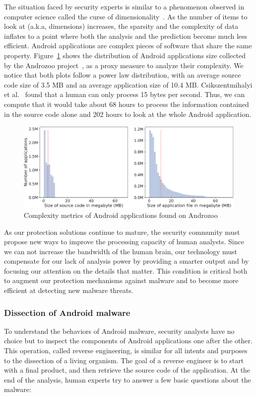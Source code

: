 The situation faced by security experts is similar to a phenomenon observed in computer science called the curse of dimensionality~\cite{bellman_dynamic_2013}.
As the number of items to look at (a.k.a, dimensions) increases, the sparsity and the complexity of data inflates to a point where both the analysis and the prediction become much less efficient.
Android applications are complex pieces of software that share the same property.
Figure~\ref{figure:introduction:complexity} shows the distribution of Android applications size collected by the Androzoo project~\cite{allix_androzoo:_2016}, as a proxy measure to analyze their complexity.
We notice that both plots follow a power law distribution, with an average source code size of 3.5 MB and an average application size of 10.4 MB.
Csikszentmihalyi et al.~\cite{csikszentmihalyi_flow_2014} found that a human can only process 15 bytes per second.
Thus, we can compute that it would take about 68 hours to process the information contained in the source code alone and 202 hours to look at the whole Android application.

\begin{figure}[!ht]
        \centering
	\includegraphics[width=\linewidth]{figures/introduction/complexity.pdf}
	\caption{Complexity metrics of Android applications found on Androzoo}
	\label{figure:introduction:complexity}
\end{figure}

As our protection solutions continue to mature, the security community must propose new ways to improve the processing capacity of human analysts.
Since we can not increase the bandwidth of the human brain, our technology must compensate for our lack of analysis power by providing a smarter output and by focusing our attention on the details that matter.
This condition is critical both to augment our protection mechanisms against malware and to become more efficient at detecting new malware threats.
\subsubsection{Dissection of Android malware}
To understand the behaviors of Android malware, security analysts have no choice but to inspect the components of Android applications one after the other.
This operation, called reverse engineering, is similar for all intents and purposes to the dissection of a living organism.
The goal of a reverse engineer is to start with a final product, and then retrieve the source code of the application.
At the end of the analysis, human experts try to answer a few basic questions about the malware:

